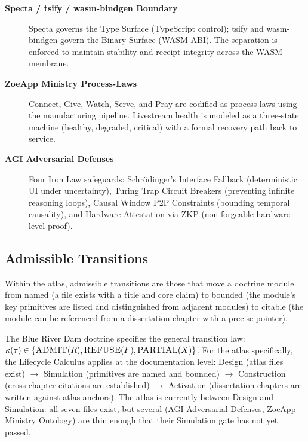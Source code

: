 \begin{description}
  \item[\textbf{Specta / tsify / wasm-bindgen Boundary}] Specta governs the
        Type Surface (TypeScript control); tsify and wasm-bindgen govern the
        Binary Surface (WASM ABI). The separation is enforced to maintain
        stability and receipt integrity across the WASM membrane.

  \item[\textbf{ZoeApp Ministry Process-Laws}] Connect, Give, Watch, Serve, and
        Pray are codified as process-laws using the manufacturing pipeline.
        Livestream health is modeled as a three-state machine (healthy, degraded,
        critical) with a formal recovery path back to service.

  \item[\textbf{AGI Adversarial Defenses}] Four Iron Law safeguards:
        Schr\"odinger's Interface Fallback (deterministic UI under uncertainty),
        Turing Trap Circuit Breakers (preventing infinite reasoning loops),
        Causal Window P2P Constraints (bounding temporal causality), and Hardware
        Attestation via ZKP (non-forgeable hardware-level proof).
\end{description}

\subsection{Admissible Transitions}
\label{sec:atlas-arch-transitions}

Within the atlas, admissible transitions are those that move a doctrine module
from named (a file exists with a title and core claim) to bounded (the module's
key primitives are listed and distinguished from adjacent modules) to citable
(the module can be referenced from a dissertation chapter with a precise pointer).

The Blue River Dam doctrine specifies the general transition law:
$\kappa(\tau) \in \{\textsc{ADMIT}(R), \textsc{REFUSE}(F), \textsc{PARTIAL}(X)\}$.
For the atlas specifically, the Lifecycle Calculus applies at the documentation
level: Design (atlas files exist) $\to$ Simulation (primitives are named and
bounded) $\to$ Construction (cross-chapter citations are established) $\to$
Activation (dissertation chapters are written against atlas anchors). The atlas
is currently between Design and Simulation: all seven files exist, but several
(AGI Adversarial Defenses, ZoeApp Ministry Ontology) are thin enough that their
Simulation gate has not yet passed.

